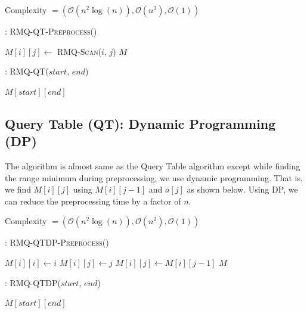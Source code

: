 \documentclass{article}
\begin{document}
Complexity $= (\mathcal{O}(n^2 \log(n)), \mathcal{O}(n^3), \mathcal{O}(1))$

\begin{algorithm}
\begin{algorithmic}[1]
\caption{: \textsc{RMQ-QT-Preprocess}()}
\medskip
{}
		\STATE $M[i][j] \gets $ \textsc{RMQ-Scan}($i$, $j$)
	\ENDFOR
\ENDFOR
\medskip
\RETURN $M$
\medskip
\end{algorithmic}
\end{algorithm}

\begin{algorithm}
\begin{algorithmic}[1]
\caption{: \textsc{RMQ-QT}($start$, $end$)}
\medskip
\RETURN $M[start][end]$
\end{algorithmic}
\end{algorithm}

\subsection{Query Table (QT): Dynamic Programming (DP)}
The algorithm is almost same as the Query Table algorithm except while finding the range minimum during preprocessing, we use dynamic programming. That is, we find $M[i][j]$ using $M[i][j-1]$ and $a[j]$ as shown below. Using DP, we can reduce the preprocessing time by a factor of $n$.

Complexity $= (\mathcal{O}(n^2 \log(n)), \mathcal{O}(n^2), \mathcal{O}(1))$

\begin{algorithm}
\begin{algorithmic}[1]
\caption{: \textsc{RMQ-QTDP-Preprocess}()}
\medskip
{}
	\STATE $M[i][i] \gets i$
\ENDFOR
\medskip
{}
			\STATE $M[i][j] \gets j$
		\ELSE
			\STATE $M[i][j] \gets M[i][j-1]$
		\ENDIF
	\ENDFOR
\ENDFOR
\medskip
\RETURN $M$
\medskip
\end{algorithmic}
\end{algorithm}

\begin{algorithm}
\begin{algorithmic}[1]
\caption{: \textsc{RMQ-QTDP}($start$, $end$)}
\medskip
\RETURN $M[start][end]$
\medskip
\end{algorithmic}
\end{algorithm}
\end{document}
